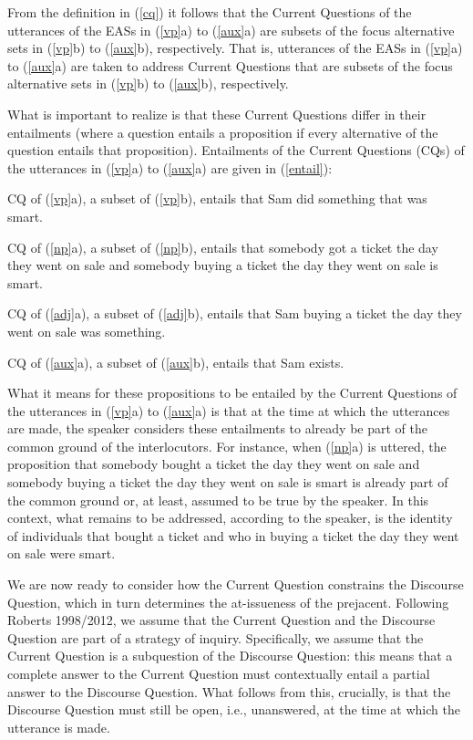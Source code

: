 \documentclass[11pt,fleqn]{article}
\newcommand{\6}{\mbox{$[\hspace*{-.6mm}[$}}
\newcommand{\9}{\mbox{$]\hspace*{-.6mm}]$}}
\begin{document}
From the definition in (\ref{cq}) it follows that the Current Questions of the utterances of the EASs in (\ref{vp}a) to (\ref{aux}a) are subsets of the focus alternative sets in (\ref{vp}b) to (\ref{aux}b), respectively. That is, utterances of the EASs in (\ref{vp}a) to (\ref{aux}a) are taken to address Current Questions that are subsets of the focus alternative sets in (\ref{vp}b) to (\ref{aux}b), respectively.

What is important to realize is that these Current Questions differ in their entailments (where a question entails a proposition if every alternative of the question entails that proposition). Entailments of the Current Questions (CQs) of the utterances in (\ref{vp}a) to (\ref{aux}a) are given in (\ref{entail}):

\begin{exe}
\ex\label{entail}

\begin{xlist}

\ex CQ of (\ref{vp}a), a subset of (\ref{vp}b), entails that Sam did something that was smart.

\ex CQ of (\ref{np}a), a subset of (\ref{np}b), entails that somebody got a ticket the day they went on sale and somebody buying a ticket the day they went on sale is smart.

\ex CQ of (\ref{adj}a), a subset of (\ref{adj}b), entails that Sam buying a ticket the day they went on sale was something.

\ex CQ of (\ref{aux}a), a subset of (\ref{aux}b), entails that Sam exists.

\end{xlist}

\end{exe}
What it means for these propositions to be entailed by the Current Questions of the utterances in (\ref{vp}a) to (\ref{aux}a) is that at the time at which the utterances are made, the speaker considers these entailments to already be part of the common ground of the interlocutors. For instance, when (\ref{np}a) is uttered, the proposition that somebody bought a ticket the day they went on sale and somebody buying a ticket the day they went on sale is smart is already part of the common ground or, at least, assumed to be true by the speaker. In this context, what remains to be addressed, according to the speaker, is the identity of individuals that bought a ticket and who in buying a ticket the day they went on sale were smart.

We are now ready to consider how the Current Question constrains the Discourse Question, which in turn determines the at-issueness of the prejacent.  Following Roberts 1998/2012\nocite{roberts98,roberts12}, we assume that the Current Question and the Discourse Question are part of a strategy of inquiry. Specifically, we assume that the Current Question is a subquestion of the Discourse Question: this means that a complete answer to the Current Question must contextually entail a partial answer to the Discourse Question. What follows from this, crucially, is that the Discourse Question must still be open, i.e., unanswered, at the time at which the utterance is made. 
\end{document}
